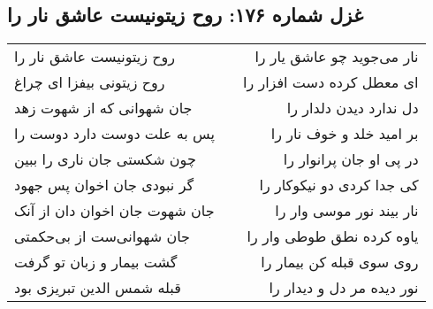 \begin{center}
\section*{غزل شماره ۱۷۶: روح زیتونیست عاشق نار را}
\label{sec:0176}
\begin{longtable}{l p{0.5cm} r}
روح زیتونیست عاشق نار را
&&
نار می‌جوید چو عاشق یار را
\\
روح زیتونی بیفزا ای چراغ
&&
ای معطل کرده دست افزار را
\\
جان شهوانی که از شهوت زهد
&&
دل ندارد دیدن دلدار را
\\
پس به علت دوست دارد دوست را
&&
بر امید خلد و خوف نار را
\\
چون شکستی جان ناری را ببین
&&
در پی او جان پرانوار را
\\
گر نبودی جان اخوان پس جهود
&&
کی جدا کردی دو نیکوکار را
\\
جان شهوت جان اخوان دان از آنک
&&
نار بیند نور موسی وار را
\\
جان شهوانی‌ست از بی‌حکمتی
&&
یاوه کرده نطق طوطی وار را
\\
گشت بیمار و زبان تو گرفت
&&
روی سوی قبله کن بیمار را
\\
قبله شمس الدین تبریزی بود
&&
نور دیده مر دل و دیدار را
\\
\end{longtable}
\end{center}
